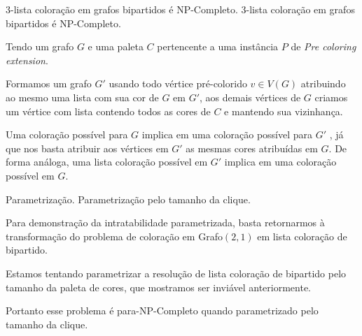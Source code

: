 \documentclass[9pt, compress]{beamer}
\begin{document}
     \begin{frame}{3-lista coloração em grafos bipartidos é NP-Completo.}
    \large{3-lista coloração em grafos bipartidos é NP-Completo.}
      \normalsize\newline\newline
            
      Tendo um grafo $G$ e uma paleta $C$ pertencente a uma instância $P$ de \emph{Pre coloring extension}.
      
      Formamos um grafo $G'$ usando todo vértice pré-colorido $v \in V(G)$ atribuindo ao mesmo uma lista com sua cor de $G$ em $G'$, aos demais vértices de $G$ criamos um vértice com lista contendo todos as cores de $C$ e mantendo sua vizinhança.
      
      Uma coloração possível para $G$ implica em uma coloração possível para $G'$ , já que nos basta atribuir aos vértices em $G'$ as mesmas cores atribuídas em $G$. De forma análoga, uma lista coloração possível em $G'$ implica em uma coloração possível em $G$.
      
      
     \end{frame}
     \begin{frame}{Parametrização.}
    \large{Parametrização pelo tamanho da clique.}
      \normalsize\newline\newline
            
      Para demonstração da intratabilidade parametrizada, basta retornarmos à transformação do problema de coloração em Grafo$(2,1)$ em lista coloração de bipartido.
      
      Estamos tentando parametrizar a resolução de lista coloração de bipartido pelo tamanho da paleta de cores, que mostramos ser inviável anteriormente.
      
      Portanto esse problema é para-NP-Completo quando parametrizado pelo tamanho da clique.
      
     \end{frame}
\end{document}
